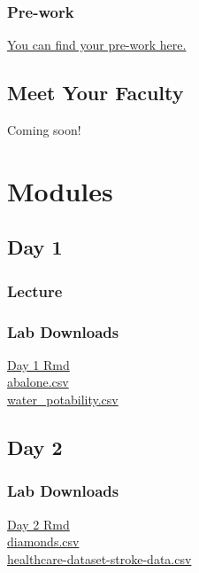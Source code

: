 \documentclass[
]{book}
\begin{document}
\section{Pre-work}\label{pre-work}

\href{https://docs.google.com/forms/d/e/1FAIpQLSeAV5gz7dADoF7JQCih9yOF7GP0IwOIxDK1ClG3jxB9yiJaQA/viewform?usp=dialog}{You can find your pre-work here.}

\chapter{Meet Your Faculty}\label{meet-your-faculty}

Coming soon!

\part{Modules}\label{part-modules}

\chapter{Day 1}\label{day-1}

\section{Lecture}\label{lecture}

\section{Lab Downloads}\label{lab-downloads}

\href{https://drive.google.com/file/d/1yfOvH9V7Bfv10zSSZn7YVtd-onhiR1zl/view?usp=sharing}{Day 1 Rmd}\\
\href{https://drive.google.com/file/d/1taCATRfEQxTA0sUqw1dBgX9812DUSMZq/view?usp=drive_link}{abalone.csv}\\
\href{https://drive.google.com/file/d/1ZOTY43EyPoNBltGedDfOdsKzq9HSA77e/view?usp=sharing}{water\_potability.csv}

\chapter{Day 2}\label{day-2}

\section{Lab Downloads}\label{lab-downloads-1}

\href{https://drive.google.com/file/d/1-n4wRfQPD_hUYc0QyYlJdvNurmbuSVHK/view?usp=sharing}{Day 2 Rmd}\\
\href{https://drive.google.com/file/d/1iK0gcxz3R1KptcHSMNbZB0YurTquQoXl/view?usp=sharing}{diamonds.csv}\\
\href{https://drive.google.com/file/d/1CREW9KyTbeG4aufgTYIDdyMCII-nuEHs/view?usp=sharing}{healthcare-dataset-stroke-data.csv}

  
\end{document}
